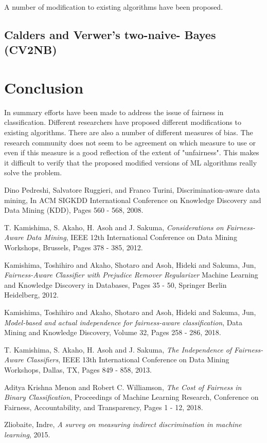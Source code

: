 \documentclass[a4paper, 12pt, titlepage]{article}
\begin{document}
A number of modification to existing algorithms have been proposed.

\subsection*{Calders and Verwer's two-naive- Bayes (CV2NB)}

\section*{Conclusion}

In summary efforts have been made to address the issue of fairness in classification. Different researchers have proposed different modifications to existing algorithms. There are also a number of different measures of bias. The research community does not seem to be agreement on which measure to use or even if this measure is a good reflection of the extent of "unfairness". This makes it difficult to verify that the proposed modified versions of ML algorithms really solve the problem.

\begin{thebibliography}{10}

  
  Dino Pedreshi, Salvatore Ruggieri, and Franco
Turini,
  Discrimination-aware data mining,
  In ACM SIGKDD International Conference on Knowledge
Discovery and Data Mining (KDD),
  Pages 560 - 568, 
  2008.

  T. Kamishima, S. Akaho, H. Asoh and J. Sakuma,
  \textit{Considerations on Fairness-Aware Data Mining},
    IEEE 12th International Conference on Data Mining Workshops, Brussels,
    Pages 378 - 385,
    2012.

  Kamishima, Toshihiro and Akaho, Shotaro and Asoh, Hideki and Sakuma, Jun,
  \textit{Fairness-Aware Classifier with Prejudice Remover Regularizer}
  Machine Learning and Knowledge Discovery in Databases,
  Pages 35 - 50,
  Springer Berlin Heidelberg,
  2012.

  Kamishima, Toshihiro and Akaho, Shotaro and Asoh, Hideki and Sakuma, Jun,
  \textit{Model-based and actual independence for fairness-aware classification},
  Data Mining and Knowledge Discovery,
  Volume 32,
  Pages 258 - 286,
  2018.

  T. Kamishima, S. Akaho, H. Asoh and J. Sakuma, 
  \textit{The Independence of Fairness-Aware Classifiers},
  IEEE 13th International Conference on Data Mining Workshops, Dallas, TX,
  Pages 849 - 858,
  2013.

  Aditya Krishna Menon and Robert C. Williamson,
  \textit{The Cost of Fairness in Binary Classification},
  Proceedings of Machine Learning Research,
  Conference on Fairness, Accountability, and Transparency,
  Pages 1 - 12,
  2018.

  Zliobaite, Indre,
  \textit{A survey on measuring indirect discrimination in machine learning}, 
  2015. 

\end{thebibliography}
\end{document}
